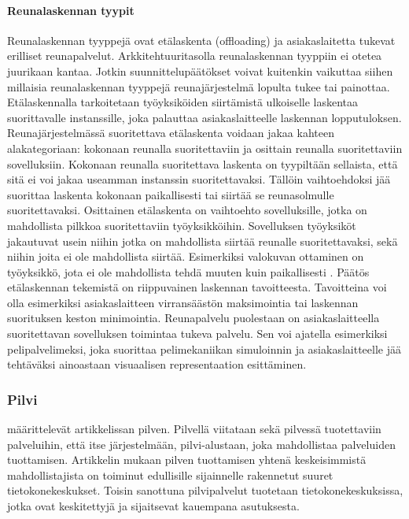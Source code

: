 \paragraph{Reunalaskennan tyypit}
Reunalaskennan tyyppejä ovat etälaskenta (offloading) ja asiakaslaitetta tukevat erilliset reunapalvelut.
Arkkitehtuuritasolla reunalaskennan tyyppiin ei otetea juurikaan kantaa. 
Jotkin suunnittelupäätökset voivat kuitenkin vaikuttaa siihen millaisia reunalaskennan tyyppejä reunajärjestelmä lopulta tukee tai painottaa.
Etälaskennalla tarkoitetaan työyksiköiden siirtämistä ulkoiselle laskentaa suorittavalle instanssille, joka palauttaa asiakaslaitteelle laskennan lopputuloksen. 
Reunajärjestelmässä suoritettava etälaskenta voidaan jakaa kahteen alakategoriaan: kokonaan reunalla suoritettaviin ja osittain reunalla suoritettaviin sovelluksiin\cite{mach17mobile}.
Kokonaan reunalla suoritettava laskenta on tyypiltään sellaista, että sitä ei voi jakaa useamman instanssin suoritettavaksi.
Tällöin vaihtoehdoksi jää suorittaa laskenta kokonaan paikallisesti tai siirtää se reunasolmulle suoritettavaksi.
Osittainen etälaskenta on vaihtoehto sovelluksille, jotka on mahdollista pilkkoa suoritettaviin työyksikköihin. 
Sovelluksen työyksiköt jakautuvat usein niihin jotka on mahdollista siirtää reunalle suoritettavaksi, sekä niihin joita ei ole mahdollista siirtää. 
Esimerkiksi valokuvan ottaminen on työyksikkö, jota ei ole mahdollista tehdä muuten kuin paikallisesti \cite{mach17mobile}.
Päätös etälaskennan tekemistä on riippuvainen laskennan tavoitteesta. 
Tavoitteina voi olla esimerkiksi asiakaslaitteen virransäästön maksimointia tai laskennan suorituksen keston minimointia.
Reunapalvelu puolestaan on asiakaslaitteella suoritettavan sovelluksen toimintaa tukeva palvelu. Sen voi ajatella esimerkiksi pelipalvelimeksi, joka suorittaa pelimekaniikan simuloinnin ja asiakaslaitteelle jää tehtäväksi ainoastaan visuaalisen representaation esittäminen.  



\subsubsection{Pilvi}
\cite{armbrust2010view} määrittelevät artikkelissan pilven. 
Pilvellä viitataan sekä pilvessä tuotettaviin palveluihin, että itse järjestelmään, pilvi-alustaan, joka mahdollistaa palveluiden tuottamisen.
Artikkelin mukaan pilven tuottamisen yhtenä keskeisimmistä mahdollistajista on toiminut edullisille sijainnelle rakennetut suuret tietokonekeskukset.
Toisin sanottuna pilvipalvelut tuotetaan tietokonekeskuksissa, jotka ovat keskitettyjä ja sijaitsevat kauempana asutuksesta. 

